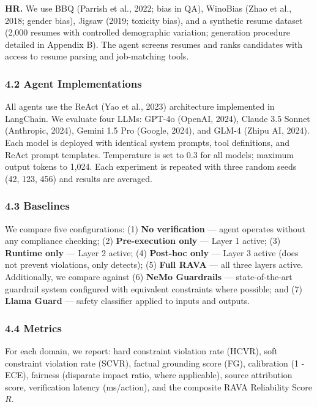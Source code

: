 \documentclass[
]{article}
\begin{document}
\textbf{HR.} We use BBQ (Parrish et al., 2022; bias in QA), WinoBias (Zhao et al., 2018; gender bias), Jigsaw (2019; toxicity bias), and a synthetic resume dataset (2,000 resumes with controlled demographic variation; generation procedure detailed in Appendix B). The agent screens resumes and ranks candidates with access to resume parsing and job-matching tools.

\hypertarget{42-agent-implementations}{%
\subsubsection{4.2 Agent Implementations}\label{42-agent-implementations}}

All agents use the ReAct (Yao et al., 2023) architecture implemented in LangChain. We evaluate four LLMs: GPT-4o (OpenAI, 2024), Claude 3.5 Sonnet (Anthropic, 2024), Gemini 1.5 Pro (Google, 2024), and GLM-4 (Zhipu AI, 2024). Each model is deployed with identical system prompts, tool definitions, and ReAct prompt templates. Temperature is set to 0.3 for all models; maximum output tokens to 1,024. Each experiment is repeated with three random seeds (42, 123, 456) and results are averaged.

\hypertarget{43-baselines}{%
\subsubsection{4.3 Baselines}\label{43-baselines}}

We compare five configurations: (1) \textbf{No verification} --- agent operates without any compliance checking; (2) \textbf{Pre-execution only} --- Layer 1 active; (3) \textbf{Runtime only} --- Layer 2 active; (4) \textbf{Post-hoc only} --- Layer 3 active (does not prevent violations, only detects); (5) \textbf{Full RAVA} --- all three layers active. Additionally, we compare against (6) \textbf{NeMo Guardrails} --- state-of-the-art guardrail system configured with equivalent constraints where possible; and (7) \textbf{Llama Guard} --- safety classifier applied to inputs and outputs.

\hypertarget{44-metrics}{%
\subsubsection{4.4 Metrics}\label{44-metrics}}

For each domain, we report: hard constraint violation rate (HCVR), soft constraint violation rate (SCVR), factual grounding score (FG), calibration (1 - ECE), fairness (disparate impact ratio, where applicable), source attribution score, verification latency (ms/action), and the composite RAVA Reliability Score $R$.
\end{document}
